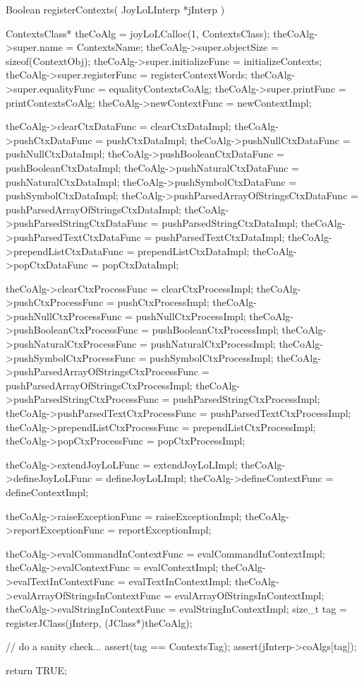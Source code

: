 \startCCode
Boolean registerContexts(
  JoyLoLInterp *jInterp
) {
  ContextsClass* theCoAlg    = 
    joyLoLCalloc(1, ContextsClass);
  theCoAlg->super.name             = ContextsName;
  theCoAlg->super.objectSize       = sizeof(ContextObj);
  theCoAlg->super.initializeFunc   = initializeContexts;
  theCoAlg->super.registerFunc     = registerContextWords;
  theCoAlg->super.equalityFunc     = equalityContextsCoAlg;
  theCoAlg->super.printFunc        = printContextsCoAlg;
  theCoAlg->newContextFunc         = newContextImpl;
  
  theCoAlg->clearCtxDataFunc       = clearCtxDataImpl;
  theCoAlg->pushCtxDataFunc        = pushCtxDataImpl;
  theCoAlg->pushNullCtxDataFunc    = pushNullCtxDataImpl;
  theCoAlg->pushBooleanCtxDataFunc = pushBooleanCtxDataImpl;
  theCoAlg->pushNaturalCtxDataFunc = pushNaturalCtxDataImpl;
  theCoAlg->pushSymbolCtxDataFunc  = pushSymbolCtxDataImpl;
  theCoAlg->pushParsedArrayOfStringsCtxDataFunc =
    pushParsedArrayOfStringsCtxDataImpl;
  theCoAlg->pushParsedStringCtxDataFunc =
    pushParsedStringCtxDataImpl;
  theCoAlg->pushParsedTextCtxDataFunc =
    pushParsedTextCtxDataImpl;
  theCoAlg->prependListCtxDataFunc = prependListCtxDataImpl;
  theCoAlg->popCtxDataFunc         = popCtxDataImpl;
  
  theCoAlg->clearCtxProcessFunc    = clearCtxProcessImpl;
  theCoAlg->pushCtxProcessFunc     = pushCtxProcessImpl;
  theCoAlg->pushNullCtxProcessFunc = pushNullCtxProcessImpl;
  theCoAlg->pushBooleanCtxProcessFunc =
    pushBooleanCtxProcessImpl;
  theCoAlg->pushNaturalCtxProcessFunc =
    pushNaturalCtxProcessImpl;
  theCoAlg->pushSymbolCtxProcessFunc =
    pushSymbolCtxProcessImpl;
  theCoAlg->pushParsedArrayOfStringsCtxProcessFunc =
    pushParsedArrayOfStringsCtxProcessImpl;
  theCoAlg->pushParsedStringCtxProcessFunc =
    pushParsedStringCtxProcessImpl;
  theCoAlg->pushParsedTextCtxProcessFunc =
    pushParsedTextCtxProcessImpl;
  theCoAlg->prependListCtxProcessFunc =
    prependListCtxProcessImpl;
  theCoAlg->popCtxProcessFunc      = popCtxProcessImpl;
  
  theCoAlg->extendJoyLoLFunc       = extendJoyLoLImpl;
  theCoAlg->defineJoyLoLFunc       = defineJoyLoLImpl;
  theCoAlg->defineContextFunc      = defineContextImpl;

  theCoAlg->raiseExceptionFunc     = raiseExceptionImpl;
  theCoAlg->reportExceptionFunc    = reportExceptionImpl;
  
  theCoAlg->evalCommandInContextFunc =
    evalCommandInContextImpl;
  theCoAlg->evalContextFunc        = evalContextImpl;
  theCoAlg->evalTextInContextFunc  = evalTextInContextImpl;
  theCoAlg->evalArrayOfStringsInContextFunc =
    evalArrayOfStringsInContextImpl;
  theCoAlg->evalStringInContextFunc =
    evalStringInContextImpl;
  size_t tag =
    registerJClass(jInterp, (JClass*)theCoAlg);

  // do a sanity check...
  assert(tag == ContextsTag);
  assert(jInterp->coAlgs[tag]);

  return TRUE;
}
\stopCCode

